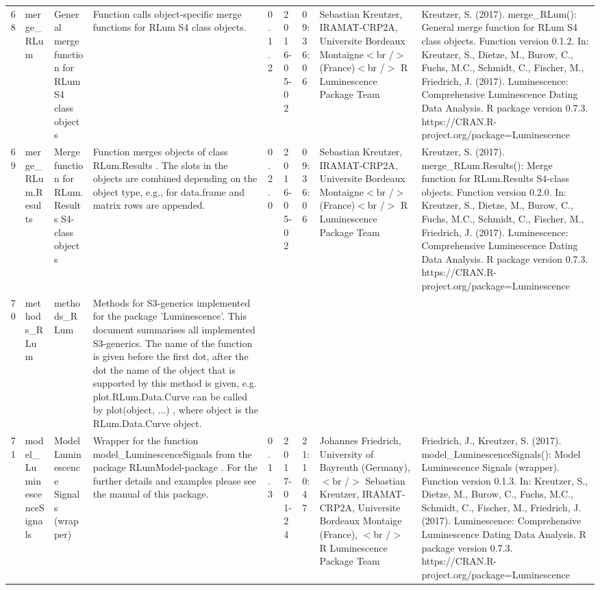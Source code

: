 \begin{table}[ht]
\begin{tabular}{rllllllll}
 \\ 
  68 & merge\_RLum & General merge function for RLum S4 class objects & Function calls object-specific merge functions for RLum S4 class objects. & 0.1.2 & 2016-05-02 & 09:36:06
 & Sebastian Kreutzer, IRAMAT-CRP2A, Universite Bordeaux Montaigne$<$br /$>$ (France)$<$br /$>$  R Luminescence Package Team & Kreutzer, S. (2017). merge\_RLum(): General merge function for RLum S4 class objects. Function version 0.1.2. In: Kreutzer, S., Dietze, M., Burow, C., Fuchs, M.C., Schmidt, C., Fischer, M., Friedrich, J. (2017). Luminescence: Comprehensive Luminescence Dating Data Analysis. R package version 0.7.3. https://CRAN.R-project.org/package=Luminescence
 \\ 
  69 & merge\_RLum.Results & Merge function for RLum.Results S4-class objects & Function merges objects of class  RLum.Results . The slots in the objects are combined depending on the object type, e.g., for  data.frame  and  matrix  rows are appended. & 0.2.0 & 2016-05-02 & 09:36:06
 & Sebastian Kreutzer, IRAMAT-CRP2A, Universite Bordeaux Montaigne$<$br /$>$ (France)$<$br /$>$  R Luminescence Package Team & Kreutzer, S. (2017). merge\_RLum.Results(): Merge function for RLum.Results S4-class objects. Function version 0.2.0. In: Kreutzer, S., Dietze, M., Burow, C., Fuchs, M.C., Schmidt, C., Fischer, M., Friedrich, J. (2017). Luminescence: Comprehensive Luminescence Dating Data Analysis. R package version 0.7.3. https://CRAN.R-project.org/package=Luminescence
 \\ 
  70 & methods\_RLum & methods\_RLum & Methods for S3-generics implemented for the package 'Luminescence'. This document summarises all implemented S3-generics. The name of the function is given before the first dot, after the dot the name of the object that is supported by this method is given, e.g.  plot.RLum.Data.Curve  can be called by  plot(object, ...) , where object  is the  RLum.Data.Curve  object. &  &  &  &  &  \\ 
  71 & model\_LuminescenceSignals & Model Luminescence Signals (wrapper) & Wrapper for the function  model\_LuminescenceSignals  from the package RLumModel-package . For the further details and examples please see the manual of this package. & 0.1.3 & 2017-01-24 & 21:10:47
 & Johannes Friedrich, University of Bayreuth (Germany), $<$br /$>$ Sebastian Kreutzer, IRAMAT-CRP2A, Universite Bordeaux Montaige (France),  $<$br /$>$  R Luminescence Package Team & Friedrich, J., Kreutzer, S. (2017). model\_LuminescenceSignals(): Model Luminescence Signals (wrapper). Function version 0.1.3. In: Kreutzer, S., Dietze, M., Burow, C., Fuchs, M.C., Schmidt, C., Fischer, M., Friedrich, J. (2017). Luminescence: Comprehensive Luminescence Dating Data Analysis. R package version 0.7.3. https://CRAN.R-project.org/package=Luminescence

\end{tabular}
\end{table}
